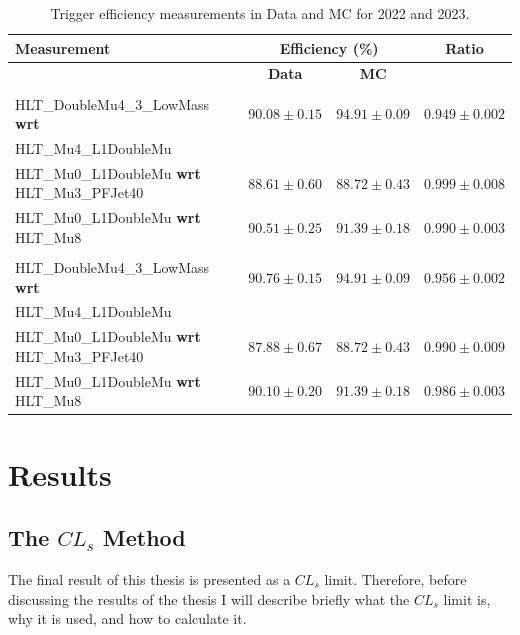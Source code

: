 \begin{table}[ht]
    \centering
    \begin{tabular}{|>{\footnotesize\raggedright\arraybackslash}p{8.1cm}|c|c|c|}
    \hline
    \textbf{Measurement} & \multicolumn{2}{c|}{\textbf{Efficiency (\%)}} & \textbf{Ratio} \\
    \cline{2-3}
    & \textbf{Data} & \textbf{MC} & \\
    \hline
    \multicolumn{4}{|c|}{\textbf{2022}} \\
    \hline
    HLT\_DoubleMu4\_3\_LowMass \textbf{wrt} & $90.08 \pm 0.15$ & $94.91 \pm 0.09$ & $0.949 \pm 0.002$ \\
    \quad\quad HLT\_Mu4\_L1DoubleMu & & & \\
    HLT\_Mu0\_L1DoubleMu \textbf{wrt} HLT\_Mu3\_PFJet40 & $88.61 \pm 0.60$ & $88.72 \pm 0.43$ & $0.999 \pm 0.008$ \\
    HLT\_Mu0\_L1DoubleMu \textbf{wrt} HLT\_Mu8 & $90.51 \pm 0.25$ & $91.39 \pm 0.18$ & $0.990 \pm 0.003$ \\
    \hline
    \multicolumn{4}{|c|}{\textbf{2023}} \\
    \hline
    HLT\_DoubleMu4\_3\_LowMass \textbf{wrt} & $90.76 \pm 0.15$ & $94.91 \pm 0.09$ & $0.956 \pm 0.002$ \\
    \quad\quad HLT\_Mu4\_L1DoubleMu & & & \\
    HLT\_Mu0\_L1DoubleMu \textbf{wrt} HLT\_Mu3\_PFJet40 & $87.88 \pm 0.67$ & $88.72 \pm 0.43$ & $0.990 \pm 0.009$ \\
    HLT\_Mu0\_L1DoubleMu \textbf{wrt} HLT\_Mu8 & $90.10 \pm 0.20$ & $91.39 \pm 0.18$ & $0.986 \pm 0.003$ \\
    \hline
    \end{tabular}
    \caption{Trigger efficiency measurements in Data and MC for 2022 and 2023.}
    \label{tab:trigger_efficiency}
\end{table}

\section{Results}

\subsection{The $CL_s$ Method}
\label{subsec:cls}

The final result of this thesis is presented as a $CL_s$ limit. Therefore, before discussing the results of the thesis I will describe briefly what the $CL_s$ limit is, why it is used, and how to calculate it. 

